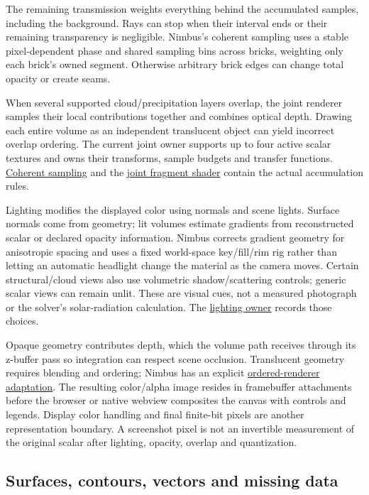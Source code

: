 \documentclass[
  11pt,
]{article}
\begin{document}
The remaining transmission weights everything behind the accumulated
samples, including the background. Rays can stop when their interval
ends or their remaining transparency is negligible. Nimbus's coherent
sampling uses a stable pixel-dependent phase and shared sampling bins
across bricks, weighting only each brick's owned segment. Otherwise
arbitrary brick edges can change total opacity or create seams.

When several supported cloud/precipitation layers overlap, the joint
renderer samples their local contributions together and combines optical
depth. Drawing each entire volume as an independent translucent object
can yield incorrect overlap ordering. The current joint owner supports
up to four active scalar textures and owns their transforms, sample
budgets and transfer functions.
\href{../ui/src/lib/vtk/coherentVolumeSampling.ts}{Coherent sampling}
and the \href{../ui/src/lib/vtk/jointVolumeShader.ts}{joint fragment
shader} contain the actual accumulation rules.

Lighting modifies the displayed color using normals and scene lights.
Surface normals come from geometry; lit volumes estimate gradients from
reconstructed scalar or declared opacity information. Nimbus corrects
gradient geometry for anisotropic spacing and uses a fixed world-space
key/fill/rim rig rather than letting an automatic headlight change the
material as the camera moves. Certain structural/cloud views also use
volumetric shadow/scattering controls; generic scalar views can remain
unlit. These are visual cues, not a measured photograph or the solver's
solar-radiation calculation. The
\href{../ui/src/lib/vtk/sceneLighting.ts}{lighting owner} records those
choices.

Opaque geometry contributes depth, which the volume path receives
through its z-buffer pass so integration can respect scene occlusion.
Translucent geometry requires blending and ordering; Nimbus has an
explicit \href{../ui/src/lib/vtk/orderedRenderer.ts}{ordered-renderer
adaptation}. The resulting color/alpha image resides in framebuffer
attachments before the browser or native webview composites the canvas
with controls and legends. Display color handling and final finite-bit
pixels are another representation boundary. A screenshot pixel is not an
invertible measurement of the original scalar after lighting, opacity,
overlap and quantization.

\subsection{Surfaces, contours, vectors and missing
data}\label{surfaces-contours-vectors-and-missing-data}
\end{document}
